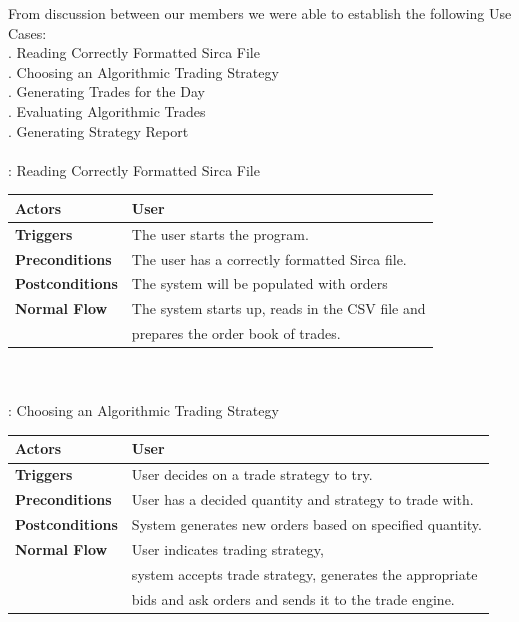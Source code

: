 \documentclass[a4paper]{article}
\begin{document}
From discussion between our members we were able to establish the following Use Cases: \\
\indent{}. Reading Correctly Formatted Sirca File	\\
\indent{}. Choosing an Algorithmic Trading Strategy 	\\	
\indent{}. Generating Trades for the Day	\\
\indent{}. Evaluating Algorithmic Trades \\	
\indent{}. Generating Strategy Report	\\
\\


: Reading Correctly Formatted Sirca File \\
    \begin{tabular}{ | l | p{10cm} |}
    \hline
    	{\bf Actors} & User \\\hline
	{\bf Triggers} & The user starts the program. \\\hline
	{\bf Preconditions} & The user has a correctly formatted Sirca file. \\\hline
	{\bf Postconditions} & The system will be populated with orders \\\hline
	{\bf Normal Flow} & The system starts up, reads in the CSV file and\\
	& prepares the order book of trades.\\\hline
    \end{tabular} \\\\

: Choosing an Algorithmic Trading Strategy \\ 
\begin{tabular}{ | l | p{10cm} |}\hline
	{\bf Actors} & User \\\hline
	{\bf Triggers} & User decides on a trade strategy to try.\\\hline
	{\bf Preconditions} & User has a decided quantity and strategy to trade with. \\\hline
	{\bf Postconditions} & System generates new orders based on specified quantity. \\\hline
	{\bf Normal Flow} & User indicates trading strategy, \\
	& system accepts trade strategy, generates the appropriate \\
	& bids and ask orders and sends it to the trade engine. \\\hline
\end{tabular} \\\\
\end{document}

